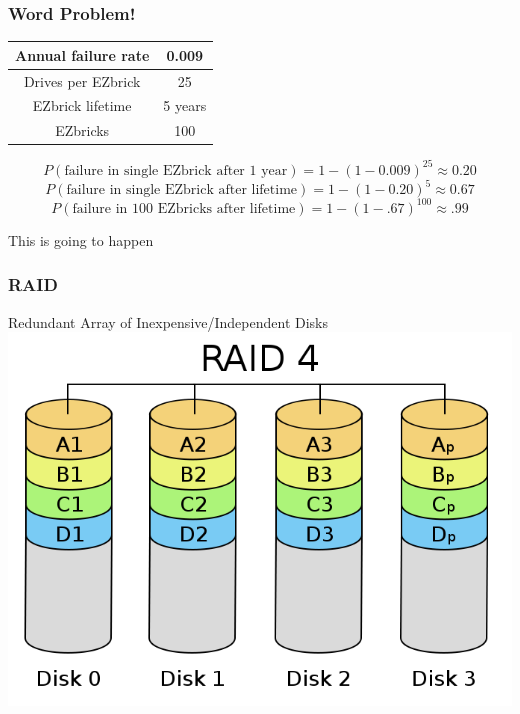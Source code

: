 \documentclass{beamer}
\theoremstyle{mystyle}
\begin{document}
\begin{frame}
\frametitle{Word Problem!}

\begin{center}
	\begin{tabular}{ | c | c | }
		\hline Annual failure rate & 0.009 \\
		\hline Drives per EZbrick & 25 \\
		\hline EZbrick lifetime & 5 years \\
		\hline EZbricks & 100 \\
		\hline 	
	\end{tabular}
\end{center}

\pause
\[ P(\text{failure in single EZbrick after 1 year} ) = 1 - (1 - 0.009)^{25} \approx 0.20\]
\pause
\[P(\text{failure in single EZbrick after lifetime} ) = 1 - (1 - 0.20)^5 \approx 0.67\]
\pause
\[P(\text{failure in 100 EZbricks after lifetime} ) = 1 - (1 -.67)^{100} \approx .99 \]
\pause
\begin{center}
This is going to happen
\end{center}
\end{frame}

\begin{frame}
\frametitle{RAID}

	\begin{center}
		Redundant Array of Inexpensive/Independent Disks
		\includegraphics[width=0.5\linewidth]{raid4}	
	\end{center}
\end{frame}

\end{document}

